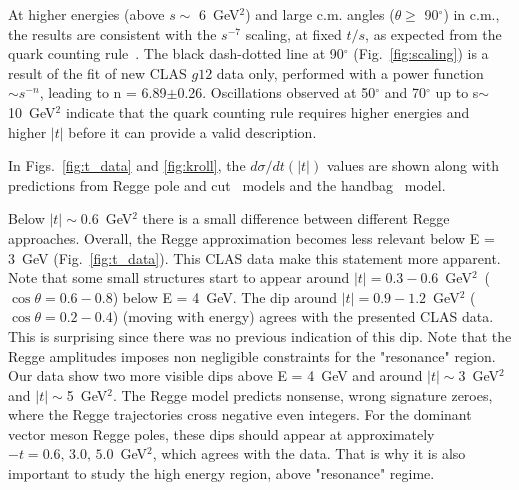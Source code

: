 \documentclass[aps,prc,twocolumn,floatfix,showpacs,preprintnumbers,amsmath,amssymb,superscriptaddress]{revtex4-1}
\begin{document}
At higher energies (above $s\sim$ 6~GeV$^2$) and large c.m. angles 
($\theta\geq$ 90$^\circ$) in c.m., the results are consistent 
with the $s^{-7}$ scaling, at fixed $t/s$, as expected from the quark counting 
rule~\cite{Stan}. The black dash-dotted line at 90$^\circ$ 
(Fig.~\ref{fig:scaling}) is a result of the fit of new CLAS 
$g12$ data only, performed with a power function $\sim s^{-n}$, 
leading to n = 6.89$\pm$0.26.  Oscillations observed at 
50$^\circ$ and 70$^\circ$ up to s$\sim$10~GeV$^2$ indicate
that the quark counting rule requires higher energies and 
higher $|t|$ before it can provide a valid description.

In Figs.~\ref{fig:t_data} and \ref{fig:kroll}, the 
$d\sigma/dt(|t|)$ values are shown along with predictions from Regge 
pole and cut~\cite{Goldstein,Laget,Mathieu,Donnachie} models and the
handbag~\cite{Kroll} model. 

Below $|t|\sim$0.6~GeV$^2$ there is a small difference between different Regge 
approaches.  Overall, the Regge approximation becomes less 
relevant below E = 3~GeV (Fig.~\ref{fig:t_data}).  This CLAS data 
make this statement more apparent.  Note that some small 
structures start to appear around $|t| = 
0.3-0.6$~GeV$^2$~($\cos\theta = 0.6-0.8$) below E = 4~GeV.  The dip 
around $|t| = 0.9-1.2$~GeV$^2$ ($\cos\theta = 0.2-0.4$) (moving 
with energy) agrees with the presented CLAS data.  This is surprising since
there was no previous indication of this dip. Note that the Regge amplitudes imposes non negligible 
constraints for the "resonance" region.  Our data show two more 
visible dips above E = 4~GeV and around $|t|\sim$3~GeV$^2$ and 
$|t|\sim$5~GeV$^2$. The Regge model predicts nonsense, wrong 
signature zeroes, where the Regge trajectories cross negative 
even integers. For the dominant vector meson Regge poles, these 
dips should appear at approximately $-t=0.6, \, 3.0, \, 
5.0$~GeV$^2$,  which agrees with the data.  That is why 
it is also important to study the high energy region, above 
"resonance" regime.
\end{document}
